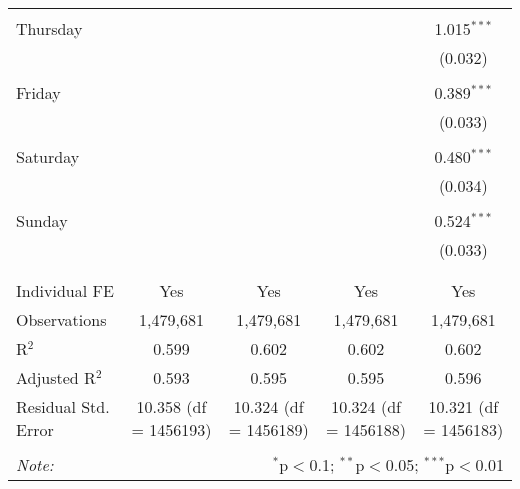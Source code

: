 \documentclass[
]{article}
\begin{document}
\begin{table}[!htbp]
{\begin{tabular}{@{\extracolsep{5pt}}lcccc}
  & & & & \\ 
 Thursday &  &  &  & 1.015$^{***}$ \\ 
  &  &  &  & (0.032) \\ 
  & & & & \\ 
 Friday &  &  &  & 0.389$^{***}$ \\ 
  &  &  &  & (0.033) \\ 
  & & & & \\ 
 Saturday &  &  &  & 0.480$^{***}$ \\ 
  &  &  &  & (0.034) \\ 
  & & & & \\ 
 Sunday &  &  &  & 0.524$^{***}$ \\ 
  &  &  &  & (0.033) \\ 
  & & & & \\ 
\hline \\[-1.8ex] 
Individual FE & Yes & Yes & Yes & Yes \\ 
Observations & 1,479,681 & 1,479,681 & 1,479,681 & 1,479,681 \\ 
R$^{2}$ & 0.599 & 0.602 & 0.602 & 0.602 \\ 
Adjusted R$^{2}$ & 0.593 & 0.595 & 0.595 & 0.596 \\ 
Residual Std. Error & 10.358 (df = 1456193) & 10.324 (df = 1456189) & 10.324 (df = 1456188) & 10.321 (df = 1456183) \\ 
\hline 
\hline \\[-1.8ex] 
\textit{Note:}  & \multicolumn{4}{r}{$^{*}$p$<$0.1; $^{**}$p$<$0.05; $^{***}$p$<$0.01} \\ 
\end{tabular}
} 
\end{table} 
\newpage
\end{document}
